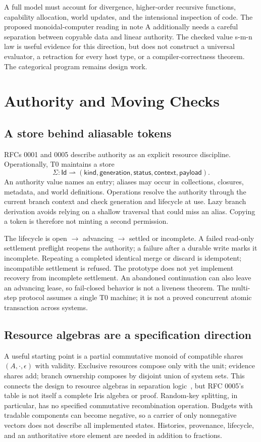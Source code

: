 \documentclass[acmsmall,screen,review,nonacm]{acmart}
\newcommand{\kw}[1]{\mathsf{#1}}
\begin{document}
A full model must account for divergence, higher-order recursive functions,
capability allocation, world updates, and the intensional inspection of code.
The proposed monoidal-computer reading in note A additionally needs a careful
separation between copyable data and linear authority. The checked value
s-m-n law is useful evidence for this direction, but does not construct a
universal evaluator, a retraction for every host type, or a compiler-correctness
theorem. The categorical program remains design work.

\section{Authority and Moving Checks}\label{sec:authority}
\subsection{A store behind aliasable tokens}
RFCs 0001 and 0005 describe authority as an explicit resource discipline.
Operationally, T0 maintains a store
\[
 \Sigma:\kw{Id}\rightharpoonup
 (\kw{kind},\kw{generation},\kw{status},\kw{context},\kw{payload}).
\]
An authority value names an entry; aliases may occur in collections, closures,
metadata, and world definitions. Operations resolve the authority through the
current branch context and check generation and lifecycle at use. Lazy branch
derivation avoids relying on a shallow traversal that could miss an alias.
Copying a token is therefore not minting a second permission.

The lifecycle is open $\to$ advancing $\to$ settled or incomplete. A failed
read-only settlement preflight reopens the authority; a failure after a durable
write marks it incomplete. Repeating a completed identical merge or discard
is idempotent; incompatible settlement is refused. The prototype does not yet
implement recovery from incomplete settlement. An abandoned continuation can
also leave an advancing lease, so fail-closed behavior is not a liveness theorem.
The multi-step protocol assumes a single T0 machine; it is not a proved
concurrent atomic transaction across systems.

\subsection{Resource algebras are a specification direction}
A useful starting point is a partial commutative monoid of compatible shares
$(A,\mathbin\cdot,\epsilon)$ with validity. Exclusive resources compose only
with the unit; evidence shares add; branch ownership composes by disjoint
union of system sets. This connects the design to resource algebras in
separation logic~\cite{iris2018}, but RFC 0005's table is not itself a complete
Iris algebra or proof. Random-key splitting, in particular, has no specified
commutative recombination operation. Budgets with tradable components can
become negative, so a carrier of only nonnegative vectors does not describe
all implemented states. Histories, provenance, lifecycle, and an authoritative
store element are needed in addition to fractions.
\end{document}
